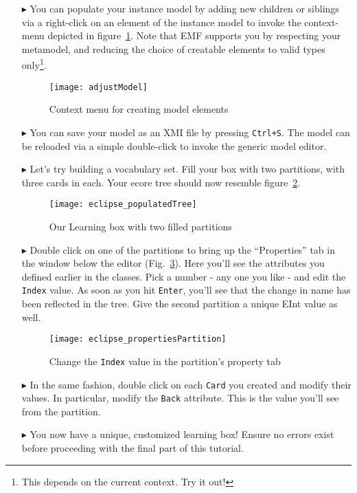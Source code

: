 \begin{itemize}
\item[$\blacktriangleright$] You can populate your instance model by adding new children or siblings via a right-click on an element of the instance model to
invoke the context-menu depicted in figure~\ref{fig:create_instance}. Note that EMF supports you by respecting your metamodel, and reducing the choice of
creatable elements to valid types only\footnote{This depends on the current context. Try it out!}.

\begin{figure}[htbp]
	\centering
  \texttt{[image: adjustModel]}
	\caption{Context menu for creating model elements}
	\label{fig:create_instance}
\end{figure}

\item[$\blacktriangleright$] You can save your model as an XMI file by pressing \texttt{Ctrl+S}. The model can be reloaded via a simple double-click to invoke
the generic model editor.

\item[$\blacktriangleright$] Let's try building a vocabulary set. Fill your box with two partitions, with three cards in each. Your ecore tree should now
resemble figure~\ref{fig:eclipse_populatedTree}.

\begin{figure}[htbp]
	\centering
  \texttt{[image: eclipse\_populatedTree]}
	\caption{Our Learning box with two filled partitions}
	\label{fig:eclipse_populatedTree}
\end{figure}

\vfill
\pagebreak

\item[$\blacktriangleright$] Double click on one of the partitions to bring up the ``Properties'' tab in the window below the editor
(Fig.~\ref{fig:properties_partition}). Here you'll see the attributes you defined earlier in the classes. Pick a number - any one you like - and edit the
\texttt{Index} value. As soon as you hit \texttt{Enter}, you'll see that the change in name has been reflected in the tree. Give the second partition a unique
EInt value as well.

\begin{figure}[htbp]
	\centering
  \texttt{[image: eclipse\_propertiesPartition]}
	\caption{Change the \texttt{Index} value in the partition's property tab}
	\label{fig:properties_partition}
\end{figure}

\item[$\blacktriangleright$] In the same fashion, double click on each \texttt{Card} you created and modify their values. In particular, modify the
\texttt{Back} attribute. This is the value you'll see from the partition.

\item[$\blacktriangleright$] You now have a unique, customized learning box! Ensure no errors exist before proceeding with the final part of this tutorial.

\end{itemize}

